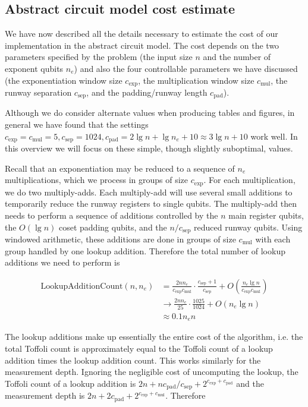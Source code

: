 \documentclass[superscriptaddress,notitlepage,longbibliography]{revtex4-1}
\theoremstyle{definition}
\theoremstyle{definition}
\newcommand{\lenexp}{{n_e}}
\newcommand{\gexp}{{c_{\text{exp}}}}
\newcommand{\gmul}{{c_{\text{mul}}}}
\newcommand{\gsep}{{c_{\text{sep}}}}
\newcommand{\gpad}{{c_{\text{pad}}}}
\begin{document}
\subsection{Abstract circuit model cost estimate}

We have now described all the details necessary to estimate the cost of our implementation in the abstract circuit model.
The cost depends on the two parameters specified by the problem (the input size $n$ and the number of exponent qubits $\lenexp$) and also the four controllable parameters we have discussed (the exponentiation window size $\gexp$, the multiplication window size $\gmul$, the runway separation $\gsep$, and the padding/runway length $\gpad$).

Although we do consider alternate values when producing tables and figures, in general we have found that the settings $\gexp=\gmul=5, \gsep=1024, \gpad=2 \lg n + \lg \lenexp + 10 \approx 3 \lg n + 10$ work well.
In this overview we will focus on these simple, though slightly suboptimal, values.

Recall that an exponentiation may be reduced to a sequence of $\lenexp$ multiplications, which we process in groups of size $\gexp$.
For each multiplication, we do two multiply-adds.
Each multiply-add will use several small additions to temporarily reduce the runway registers to single qubits.
The multiply-add then needs to perform a sequence of additions controlled by the $n$ main register qubits, the $O(\lg n)$ coset padding qubits, and the $n/\gsep$ reduced runway qubits.
Using windowed arithmetic, these additions are done in groups of size $\gmul$ with each group handled by one lookup addition.
Therefore the total number of lookup additions we need to perform is

\begin{equation}
\begin{aligned}
    \text{LookupAdditionCount}(n, \lenexp)
    &= \frac{2 n \lenexp}{\gexp \gmul} \cdot \frac{\gsep + 1}{\gsep} + O\left( \frac{\lenexp \lg n}{\gexp \gmul} \right)
    \\&\rightarrow \frac{2 n \lenexp}{25} \cdot \frac{1025}{1024} + O\left(\lenexp \lg n\right)
    \\&\approx 0.1 \lenexp n
\end{aligned}
\end{equation}

The lookup additions make up essentially the entire cost of the algorithm, i.e.
the total Toffoli count is approximately equal to the Toffoli count of a lookup addition times the lookup addition count.
This works similarly for the measurement depth.
Ignoring the negligible cost of uncomputing the lookup, the Toffoli count of a lookup addition is $2n + n \gpad / \gsep + 2^{\gexp + \gpad}$ and the measurement depth is $2n + 2 \gpad + 2^{\gexp + \gmul}$.
Therefore
\end{document}
